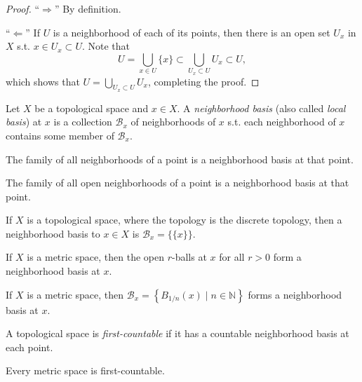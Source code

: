 \begin{proof}
	\enquote{$\Rightarrow$} By definition.
	
	\enquote{$\Leftarrow$} If $U$ is a neighborhood of each of its points, then there is an open set $U_x$ in $X$ s.t. $x\in U_x\subset U$. Note that \cite{3964428}
	$$U = \bigcup_{x\in U}\{x\} \subset \bigcup_{U_x\subset U}U_x\subset U,$$ which shows that $U = \bigcup_{U_x\subset U}U_x$, completing the proof.
\end{proof}

\begin{defn}
	Let $X$ be a topological space and $x\in X$. A \textit{neighborhood basis} (also called \textit{local basis}) at $x$ is a collection $\mathscr B_x$ of neighborhoods of $x$ s.t. each neighborhood of $x$ contains some member of $\mathscr B_x$.
\end{defn}

\begin{exmp}
	The family of all neighborhoods of a point is a neighborhood basis at that point.
\end{exmp}

\begin{exmp}
	The family of all open neighborhoods of a point is a neighborhood basis at that point.
\end{exmp}

\begin{exmp}
	If $X$ is a topological space, where the topology is the discrete topology, then a neighborhood basis to $x\in X$ is $\mathscr B_x = \{\{x\}\}$.
\end{exmp}

\begin{exmp}
	If $X$ is a metric space, then the open $r$-balls at $x$ for all $r > 0$ form a neighborhood basis at $x$.
\end{exmp}

\begin{exmp}\label{exmp:metrizable_top_space_countable_neighborhood_basis}
	If $X$ is a metric space, then $\mathscr B_x = \left\{B_{1/n}(x) \mid n\in\mathbb N\right\}$ forms a neighborhood basis at $x$.
\end{exmp}

\begin{defn}
	A topological space is \textit{first-countable} if it has a countable neighborhood basis at each point.
\end{defn}

\begin{exmp}
	Every metric space is first-countable.
\end{exmp}

